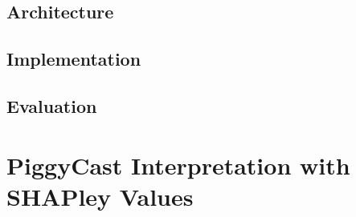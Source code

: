 \documentclass{article}
\begin{document}
\subsection{Architecture}
\subsection{Implementation}

\subsection{Evaluation}

\section{PiggyCast Interpretation with SHAPley Values}








\end{document}
